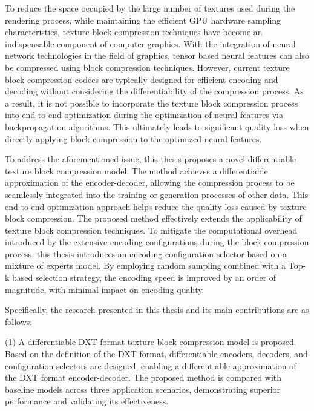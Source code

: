 \begin{abstract*}

  To reduce the space occupied by the large number of textures used during the rendering process, 
  while maintaining the efficient GPU hardware sampling characteristics, 
  texture block compression techniques have become an indispensable component of computer graphics. 
  With the integration of neural network technologies in the field of graphics, 
  tensor based neural features can also be compressed using block compression techniques. 
  However, current texture block compression codecs are typically designed for efficient encoding and decoding without considering the differentiability of the compression process. 
  As a result, it is not possible to incorporate the texture block compression process into end-to-end optimization during the optimization of neural features via backpropagation algorithms. 
  This ultimately leads to significant quality loss when directly applying block compression to the optimized neural features.

  To address the aforementioned issue, 
  this thesis proposes a novel differentiable texture block compression model. 
  The method achieves a differentiable approximation of the encoder-decoder, 
  allowing the compression process to be seamlessly integrated into the training or generation processes of other data. 
  This end-to-end optimization approach helps reduce the quality loss caused by texture block compression. 
  The proposed method effectively extends the applicability of texture block compression techniques. 
  To mitigate the computational overhead introduced by the extensive encoding configurations during the block compression process, 
  this thesis introduces an encoding configuration selector based on a mixture of experts model. 
  By employing random sampling combined with a Top-k based selection strategy, 
  the encoding speed is improved by an order of magnitude, with minimal impact on encoding quality.

  Specifically, the research presented in this thesis and its main contributions are as follows:

  (1) A differentiable DXT-format texture block compression model is proposed. 
  Based on the definition of the DXT format, differentiable encoders, decoders, 
  and configuration selectors are designed, enabling a differentiable approximation of the DXT format encoder-decoder. 
  The proposed method is compared with baseline models across three application scenarios, 
  demonstrating superior performance and validating its effectiveness.
  

\end{abstract*}
